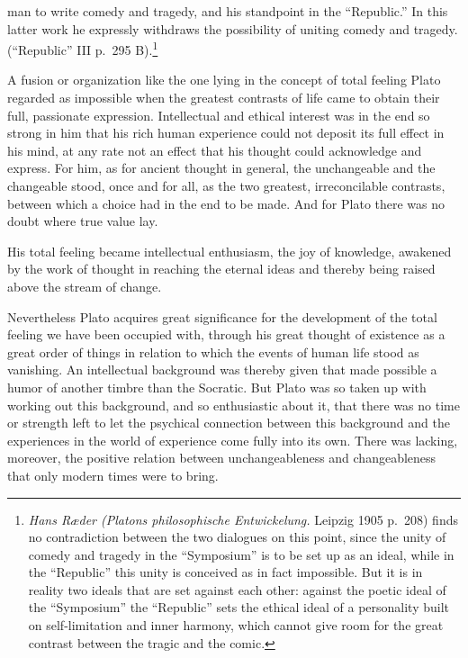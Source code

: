 \documentclass[12pt]{book}
\newcommand{\opage}[1]{\marginnote{\footnotesize\textit{[#1]}}}
\begin{document}
man to write comedy and tragedy, and his standpoint in the ``Republic.'' In this latter work he
expressly withdraws the possibility of uniting comedy and tragedy. (``Republic'' III p.~295
B).\footnote{\textit{Hans Ræder (Platons philosophische Entwickelung.} Leipzig 1905 p.~208) finds
no contradiction between the two dialogues on this point, since the unity of comedy and tragedy in
the ``Symposium'' is to be set up as an ideal, while in the ``Republic'' this unity is conceived as
in fact impossible. But it is in reality two ideals that are set against each other: against the
poetic ideal of the ``Symposium'' the ``Republic'' sets the ethical ideal of a personality built on
self-limitation and inner harmony, which cannot give room for the great contrast between the tragic
and the comic.} %

A fusion or organization like the one lying in the concept of total feeling Plato regarded as
impossible when the greatest contrasts of life came to obtain their full, passionate expression.
Intellectual and ethical interest was in the end so strong in him that his rich human experience
could not deposit its full effect in his mind, at any rate not an effect that his thought could
acknowledge and express. For him, as for ancient thought in general, the unchangeable and the
changeable stood, once and for all, as the two greatest, irreconcilable contrasts,
\opage{153}between which a choice had in the end to be made. And for Plato there was no doubt
where true value lay.

His total feeling became intellectual enthusiasm, the joy of knowledge, awakened by the work of
thought in reaching the eternal ideas and thereby being raised above the stream of change.

Nevertheless Plato acquires great significance for the development of the total feeling we have
been occupied with, through his great thought of existence as a great order of things in relation
to which the events of human life stood as vanishing. An intellectual background was thereby
given that made possible a humor of another timbre than the Socratic. But Plato was so taken up
with working out this background, and so enthusiastic about it, that there was no time or strength
left to let the psychical connection between this background and the experiences in the world of
experience come fully into its own. There was lacking, moreover, the positive relation between
unchangeableness and changeableness that only modern times were to bring.
\end{document}
